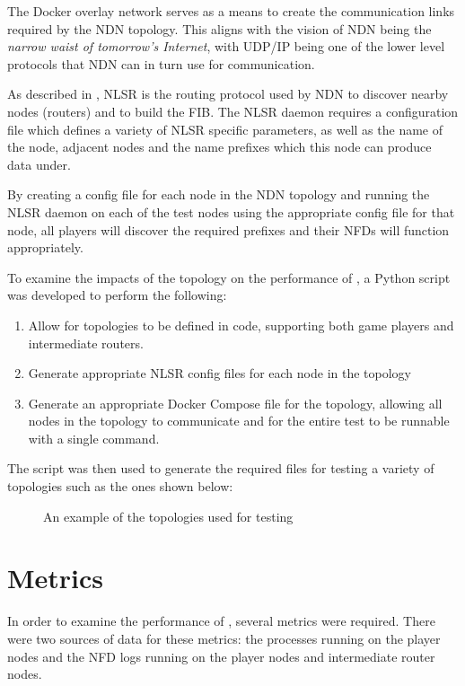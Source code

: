 The Docker overlay network serves as a means to create the communication links required by the NDN topology. This aligns with the vision of NDN being the \textit{narrow waist of tomorrow's Internet}, with UDP/IP being one of the lower level protocols that NDN can in turn use for communication.

As described in , NLSR is the routing protocol used by NDN to discover nearby nodes (routers) and to build the FIB. The NLSR daemon requires a configuration file which defines a variety of NLSR specific parameters, as well as the name of the node, adjacent nodes and the name prefixes which this node can produce data under. 

By creating a config file for each node in the NDN topology and running the NLSR daemon on each of the test nodes using the appropriate config file for that node, all players will discover the required prefixes and their NFDs will function appropriately.

To examine the impacts of the topology on the performance of \game{}, a Python script was developed to perform the following:

\begin{enumerate}
    \item Allow for topologies to be defined in code, supporting both game players and intermediate routers.
    \item Generate appropriate NLSR config files for each node in the topology
    \item Generate an appropriate Docker Compose file for the topology, allowing all nodes in the topology to communicate and for the entire test to be runnable with a single command.
\end{enumerate}

The script was then used to generate the required files for testing a variety of topologies such as the ones shown below:

\begin{figure}[H]
    \centering
    \caption{An example of the topologies used for testing \game{}}
    \label{fig:impl:topologies}
\end{figure}


\section{Metrics}\label{sec:impl:metrics}
In order to examine the performance of \game{}, several metrics were required. There were two sources of data for these metrics: the \game{} processes running on the player nodes and the NFD logs running on the player nodes and intermediate router nodes. 

